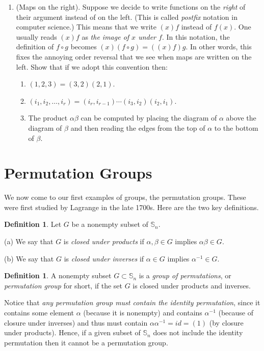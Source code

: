 \documentclass[11pt]{article}
\newenvironment{problems}
{
 \begin{enumerate}[topsep=1pt,itemsep=0pt,parsep=2pt,leftmargin=0.6cm,%
 label={\arabic*.}, ref=\arabic*] \small
}
{
 \end{enumerate}
}
\theoremstyle{definition}
\newtheorem{defn}[thm]{Definition}
\newcommand{\compose}{\circ} %
\newcommand{\Sym}{\mathbb{S}}
\begin{document}
\begin{problems}
\item (Maps on the right). Suppose we decide
  to write functions on the \emph{right} of their argument instead of
  on the left.  (This is called \emph{postfix} notation in computer
  science.) This means that we write $(x)f$ instead of $f(x)$. One
  usually reads $(x)f$ as \emph{the image of $x$ under $f$}. In this
  notation, the definition of $f \compose g$ becomes $(x)(f \compose
  g) = ((x)f)g$. In other words, this fixes the annoying order
  reversal that we see when maps are written on the left.  Show that
  if we adopt this convention then:
  \begin{enumerate}
  \item $(1,2,3) = (3,2)(2,1)$.
  \item $(i_1, i_2, \dots, i_r) = (i_r, i_{r-1}) \cdots (i_3,i_2)(i_2,i_1)$.
  \item The product $\alpha \beta$ can be computed by placing the
    diagram of $\alpha$ above the diagram of $\beta$ and then reading
    the edges from the top of $\alpha$ to the bottom of $\beta$.
  \end{enumerate}

\end{problems}


\newpage\section{Permutation Groups}\noindent
We now come to our first examples of groups, the permutation
groups. These were first studied by Lagrange in the late 1700s.  Here
are the two key definitions.


\begin{defn}
  Let $G$ be a nonempty subset of $\Sym_n$. 

  (a) We say that $G$ is \emph{closed under products} if $\alpha, \beta
  \in G$ implies $\alpha \beta \in G$.

  (b) We say that $G$ is \emph{closed under inverses} if $\alpha \in
  G$ implies $\alpha^{-1} \in G$.
\end{defn}



\begin{defn}
  A nonempty subset $G \subset \Sym_n$ is a \emph{group of
    permutations}, or \emph{permutation group} for short, if the set
  $G$ is closed under products and inverses.
\end{defn}

Notice that {\em any permutation group must contain the identity
  permutation}, since it contains some element $\alpha$ (because it is
nonempty) and contains $\alpha^{-1}$ (because of closure under
inverses) and thus must contain $\alpha \alpha^{-1} = id = (1)$ (by
closure under products).  Hence, if a given subset of $\Sym_n$ does
not include the identity permutation then it cannot be a permutation
group.
\end{document}
